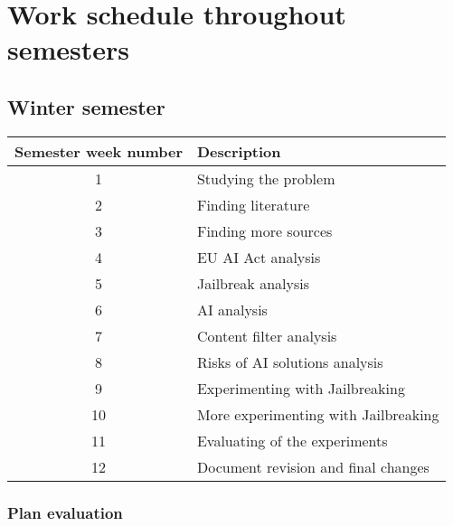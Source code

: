 \setcounter{figure}{0}
\setcounter{listing}{0}

\chapter{Work schedule throughout semesters \label{cha:work_schedule} }

\section*{Winter semester}

\begin{table}[hp]
    \centering
    \begin{tabular}{|c|l|}
    \hline
    \textbf{Semester week number} & \textbf{Description} \\ \hline

    1 & Studying the problem  \\ \hline
    2 & Finding literature \\ \hline
    3 & Finding more sources \\ \hline
    4 & EU AI Act analysis \\ \hline
    5 & Jailbreak analysis \\ \hline
    6 & AI analysis \\ \hline
    7 & Content filter analysis \\ \hline
    8 & Risks of AI solutions analysis \\ \hline
    9 & Experimenting with Jailbreaking \\ \hline
    10 & More experimenting with Jailbreaking \\ \hline
    11 & Evaluating of the experiments \\ \hline
    12 & Document revision and final changes \\ \hline
    \end{tabular}
\end{table}

\subsection*{Plan evaluation}

